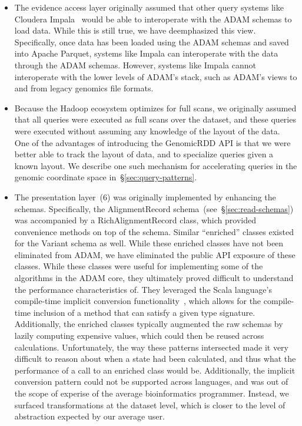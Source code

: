 \documentclass[phd]{ucbthesis}
\begin{document}
\begin{itemize}
\item The evidence access layer originally assumed that other query systems like
  {Cloudera Impala}~\cite{kornacker15} would be able to interoperate with
  the {ADAM} schemas to load data. While this is still true, we have
  deemphasized this view. Specifically, once data has been loaded using the
  {ADAM} schemas and saved into {Apache Parquet}, systems like
  {Impala} can interoperate with the data through the {ADAM}
  schemas. However, systems like {Impala} cannot interoperate with
  the lower levels of {ADAM}'s stack, such as {ADAM}'s views to
  and from legacy genomics file formats.
\item Because the {Hadoop} ecosystem optimizes for full scans, we
  originally assumed that all queries were executed as full scans over the
  dataset, and these queries were executed without assuming any knowledge of the
  layout of the data. One of the advantages of introducing the
  {GenomicRDD} API is that we were better able to track the layout of
  data, and to specialize queries given a known layout. We describe one such
  mechanism for accelerating queries in the genomic coordinate space
  in~\S\ref{sec:query-patterns}.
\item The presentation layer~(6) was originally implemented by enhancing the
  schemas. Specifically, the {AlignmentRecord}
  schema~(see~\S\ref{sec:read-schemas}) was accompanied by a
  {RichAlignmentRecord} class, which provided convenience methods on top
  of the schema. Similar ``enriched'' classes existed for the {Variant}
  schema as well. While these enriched classes have not been eliminated from
  {ADAM}, we have eliminated the public API exposure of these classes.
  While these classes were useful for implementing some of the algorithms in the
  {ADAM} core, they ultimately proved difficult to understand the
  performance characteristics of. They leveraged the {Scala} language's
  compile-time implicit conversion functionality~\cite{odersky04}, which allows for
  the compile-time inclusion of a method that can satisfy a given type
  signature. Additionally, the enriched classes typically augmented the raw
  schemas by lazily computing expensive values, which could then be reused
  across calculations. Unfortunately, the way these patterns intersected made it
  very difficult to reason about when a state had been calculated, and thus what
  the performance of a call to an enriched class would be. Additionally, the
  implicit conversion pattern could not be supported across languages, and was
  out of the scope of experise of the average bioinformatics programmer.
  Instead, we surfaced transformations at the dataset level, which is closer to
  the level of abstraction expected by our average user.
\end{itemize}
\end{document}
